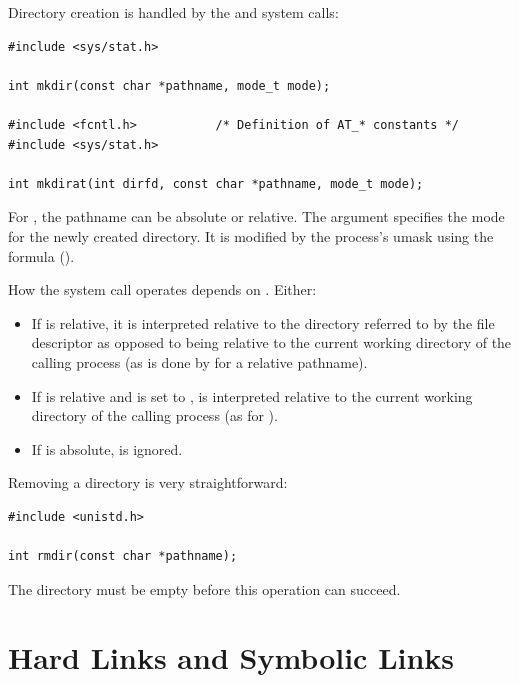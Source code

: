 Directory creation is handled by the  and  system calls:

\begin{lstlisting}
#include <sys/stat.h>

int mkdir(const char *pathname, mode_t mode);

#include <fcntl.h>           /* Definition of AT_* constants */ 
#include <sys/stat.h>

int mkdirat(int dirfd, const char *pathname, mode_t mode);
\end{lstlisting}

\noindent
For , the pathname can be absolute or relative. The  argument specifies the mode for the newly created directory. It is modified by the process's umask using the formula ().

How the  system call operates depends on . Either:

\begin{itemize}
	\item If  is relative, it is interpreted relative to the directory referred to  by  the  file  descriptor  
		as opposed to being relative to the current working directory of the calling process (as is done by  
		for a relative pathname).
	\item If  is relative and  is set to ,   is interpreted relative to 
		the current working directory of the calling process (as for ).
	\item If  is absolute,  is ignored.
\end{itemize}

\noindent
Removing a directory is very straightforward:

\begin{lstlisting}
#include <unistd.h>

int rmdir(const char *pathname);
\end{lstlisting}

\noindent
The directory must be empty before this operation can succeed.


\section{Hard Links and Symbolic Links}\label{prog-links}

